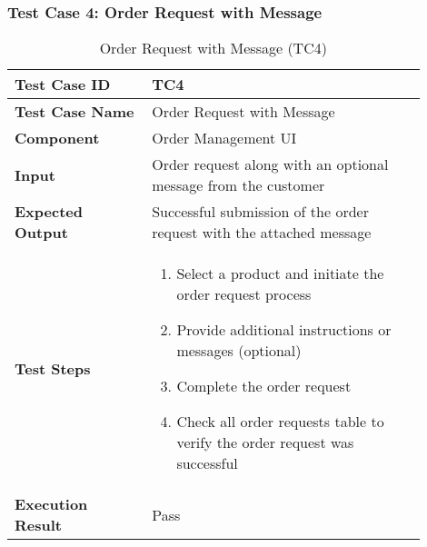 \begin{table}[h]
	\subsubsection{Test Case 4: Order Request with Message}
	\centering
	\caption{Order Request with Message (TC4)}
	\begin{tabular}{|p{0.3\linewidth}|p{0.6\linewidth}|}
		\hline
		\textbf{Test Case ID} & TC4 \\
		\hline
		\textbf{Test Case Name} & Order Request with Message \\
		\hline
		\textbf{Component} & Order Management UI \\
		\hline
		\textbf{Input} & Order request along with an optional message from the customer \\
		\hline
		\textbf{Expected Output} & Successful submission of the order request with the attached message \\
		\hline
		\textbf{Test Steps} & 
		\begin{enumerate}
			\item Select a product and initiate the order request process
			\item Provide additional instructions or messages (optional)
			\item Complete the order request
			\item Check all order requests table to verify the order request was successful
		\end{enumerate} \\
		\hline
		\textbf{Execution Result} & Pass \\
		\hline
	\end{tabular}
\end{table}

